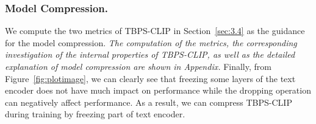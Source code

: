 \documentclass[letterpaper]{article} %
\begin{document}

\subsubsection{Model Compression.}



We compute the two metrics of TBPS-CLIP in Section~\ref{sec:3.4} as the guidance for the model compression.
\emph{The computation of the metrics, the corresponding investigation of the internal properties of TBPS-CLIP, as well as the detailed explanation of model compression are shown in Appendix.}
Finally, from Figure~\ref{fig:plotimage}, we can clearly see that freezing some layers of the text encoder does not have much impact on performance while the dropping operation can negatively affect performance.
As a result, we can compress TBPS-CLIP during training by freezing part of text encoder.
\end{document}
